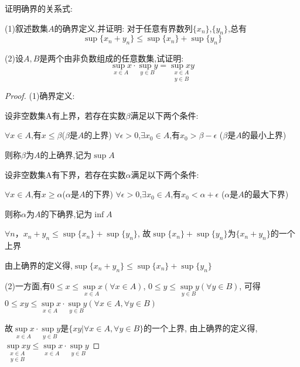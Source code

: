 \clearpage
\begin{exercise}
    证明确界的关系式:

    (1)叙述数集$A$的确界定义,并证明:
    对于任意有界数列$\{x_n\}$,$\{y_n\}$,总有
    \begin{equation}
        \sup\{x_n+y_n\}\le \sup\{x_n\}+\sup\{y_n\}
    \end{equation}

    (2)设$A,B$是两个由非负数组成的任意数集,试证明:
    \begin{equation}
        \underset{x\in A}{\sup x} \cdot \underset{y \in B}{\sup y} = \underset{y \in B}{\underset{x \in A}{\sup xy}}
    \end{equation}
\end{exercise}

\begin{proof}
    (1)确界定义:
    
    设非空数集A有上界，若存在实数$\beta$满足以下两个条件:

    $\forall x\in A$,有$x\le \beta$\quad($\beta$是$A$的上界)
    \qquad
    $\forall \epsilon>0$,$\exists x_0 \in A$,有$x_0>\beta - \epsilon$ \quad ($\beta$是$A$的最小上界)

    则称$\beta$为$A$的上确界,记为$\sup A$
    \vspace{3pt}

    设非空数集A有下界，若存在实数$\alpha$满足以下两个条件:

    $\forall x\in A$,有$x\ge \alpha$\quad($\alpha$是$A$的下界)
    \qquad
    $\forall \epsilon>0$,$\exists x_0 \in A$,有$x_0<\alpha + \epsilon$ \quad ($\alpha$是$A$的最大下界)

    则称$\alpha$为$A$的下确界,记为$\inf A$

    \vspace{3pt}
    $\forall n$，$x_n+y_n\le \sup\{x_n\}+\sup\{y_n\}$,
    故$\sup\{x_n\}+\sup\{y_n\}$为$\{x_n+y_n\}$的一个上界

    由上确界的定义得,$\sup\{x_n+y_n\}\le \sup\{x_n\}+\sup\{y_n\}$

    \vspace{3pt}
    (2)一方面,有$0\le x \le \underset{x\in A}{\sup x}(\forall x\in A)$,
    $0 \le y \le \underset{y\in B}{\sup y}(\forall y\in B)$,
    可得$0\le xy \le \underset{x\in A}{\sup x}\cdot \underset{y\in B}{\sup y} (\forall x\in A,\forall y\in B)$

    故$\underset{x\in A}{\sup x}\cdot \underset{y\in B}{\sup y} $是$\{xy|\forall x\in A,\forall y\in B\}$的一个上界,
    由上确界的定义得,$\underset{y \in B}{\underset{x \in A}{\sup xy}}\le \underset{x\in A}{\sup x}\cdot \underset{y\in B}{\sup y}$


\end{proof}
